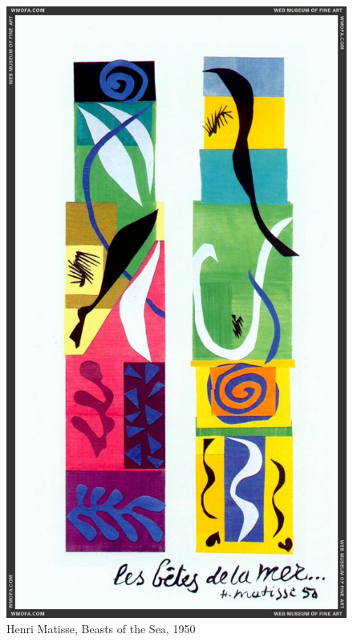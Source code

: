 \begin{figure}[h]
	\centering
	\includegraphics[width=12cm]{inspire/BeastSea.jpg}
	\caption{Henri Matisse, Beasts of the Sea, 1950}
	\label{fig:MatisseBeastsofSea}
\end{figure}


